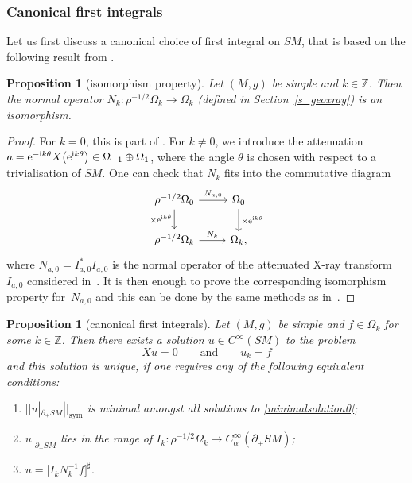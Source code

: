 \documentclass[10pt,a4paper]{amsart}
\numberwithin{equation}{section}
\newtheorem{Proposition}[Theorem]{Proposition}
\theoremstyle{definition}
\newcommand{\Z}{\mathbb{Z}} %
\newcommand{\1}{{\bf 1}}
\begin{document}
\subsubsection{Canonical first integrals}
 Let us first discuss a canonical choice of first integral on $SM$, that is based on the following result from \cite{MNP19a}.

\begin{Proposition}[isomorphism property]\label{prop_isonk}
	Let $(M,g)$ be simple and $k\in \Z$. Then the normal operator $N_k\colon \rho^{-1/2}\Omega_k\to \Omega_k$ {\rm(}defined in Section~{\rm\ref{s_geoxray})} is an isomorphism.
\end{Proposition}

\begin{proof}
For $k=0$, this is part of \cite[Theorem 2.2]{MNP19a}. For $k\neq 0$, we introduce the attenuation $a= {\rm e}^{-{\rm i}k\theta} X\bigl({\rm e}^{{\rm i}k\theta}\bigr)\in \Omega_{-1}\oplus\Omega_1$, where the angle $\theta$ is chosen with respect to a trivialisation of $SM$. One can check that $N_k$ fits into the commutative diagram
\[
	\begin{tikzcd}
		\rho^{-1/2}\Omega_0 \arrow["N_{a,0}"]{r} \arrow[swap,"\times {\rm e}^{{\rm i}k\theta}"]{d}& \Omega_0 \arrow["\times {\rm e}^{{\rm i}k\theta}"]{d}\\
		\rho^{-1/2}\Omega_k \arrow["N_k"]{r} & \Omega_k,
	\end{tikzcd}
\]
where $N_{a,0}=I_{a,0}^*I_{a,0}$ is the normal operator of the attenuated X-ray transform $I_{a,0}$ considered in~\cite[Section~12.2]{PSU23}. It is then enough to prove the corresponding isomorphism property for~$N_{a,0}$ and this can be done by the same methods as in~\cite{MNP19a}.
\end{proof}

\begin{Proposition}[canonical first integrals]\label{minimalsolution} Let $(M,g)$ be simple and $f\in \Omega_k$ for some $k\in \Z$. Then there exists a solution $u\in C^\infty(SM)$ to the problem
\begin{equation}\label{minimalsolution0}
		X u = 0 \qquad \text{and} \qquad u_k = f
\end{equation}
and this solution is unique, if one requires any of the following equivalent conditions:
\begin{enumerate}[label=\rm (\roman*)]\itemsep=0pt
	\item\label{minimalsolution1} $||u|_{\partial_+SM}||_{\mathrm{sym}}$ is minimal amongst all solutions to \eqref{minimalsolution0};
	
	\item\label{minimalsolution2} $u\vert_{\partial_+SM}$ lies in the range of $I_k\colon \rho^{-1/2}\Omega_k \rightarrow C_\alpha^\infty(\partial_+SM)$;
	
	\item\label{minimalsolution3} $u = \big[I_k N_k^{-1} f\big]^\sharp$.
\end{enumerate}
\end{Proposition}
\end{document}
